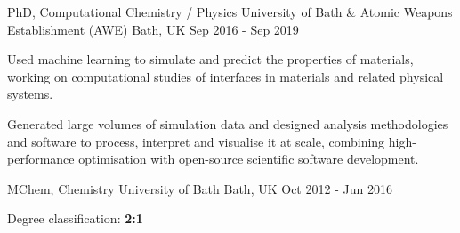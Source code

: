 \begin{cventries}
  \cventry
    {PhD, Computational Chemistry / Physics}
    {University of Bath \& Atomic Weapons Establishment (AWE)}
    {Bath, UK}
    {Sep 2016 - Sep 2019}
    {
      \begin{cvitems}
        \item {Used machine learning to simulate and predict the properties of materials, working on computational studies of interfaces in materials and related physical systems.}
        \item {Generated large volumes of simulation data and designed analysis methodologies and software to process, interpret and visualise it at scale, combining high-performance optimisation with open-source scientific software development.}
      \end{cvitems}
    }
\end{cventries}

\begin{cventries}
  \cventry
    {MChem, Chemistry}
    {University of Bath}
    {Bath, UK}
    {Oct 2012 - Jun 2016}
    {
      \begin{cvitems}
        \item {Degree classification: \textbf{2:1}}
      \end{cvitems}
    }
\end{cventries}
